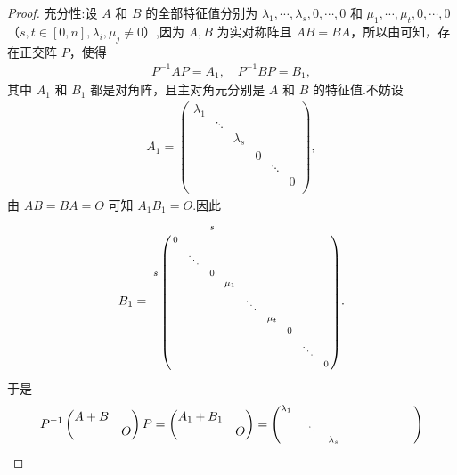 \documentclass[../../main.tex]{subfiles}
\begin{document}
\begin{proof}
{\heiti 充分性:}设 $A$ 和 $B$ 的全部特征值分别为 $\lambda _1,\cdots ,\lambda _s,0,\cdots ,0$ 和 $\mu _1,\cdots ,\mu _t,0,\cdots ,0$（$s,t\in [0,n],\lambda _i,\mu _j\ne 0$）,因为 $A,B$ 为实对称阵且 $AB=BA$，所以由可知，存在正交阵 $P$，使得
\begin{align*}
P^{-1}AP=A_1,\quad P^{-1}BP=B_1,
\end{align*}
其中 $A_1$ 和 $B_1$ 都是对角阵，且主对角元分别是 $A$ 和 $B$ 的特征值.不妨设
\begin{align*}
A_1=\begin{pmatrix}
\lambda _1&		&		&		&		&		\\
&		\ddots&		&		&		&		\\
&		&		\lambda _s&		&		&		\\
&		&		&		0&		&		\\
&		&		&		&		\ddots&		\\
&		&		&		&		&		0\\
\end{pmatrix},
\end{align*}
由 $AB=BA=O$ 可知 $A_1B_1=O$.因此
\begin{align*}
B_1=\begin{scriptsize}\bordermatrix{%
&       &		&		s&		&		&		&		&		&		\cr
&       0&		&		&		&		&		&		&		&		\cr
&       &		\ddots&		&		&		&		&		&		&		\cr
s&       &		&		0&		&		&		&		&		&		\cr
&       &		&		&		\mu _1&		&		&		&		&		\cr
&       &		&		&		&		\ddots&		&		&		&		\cr
&       &		&		&		&		&		\mu _t&		&		&		\cr
&       &		&		&		&		&		&		0&		&		\cr
&       &		&		&		&		&		&		&		\ddots&		\cr
&       &		&		&		&		&		&		&		&		0\cr
}\end{scriptsize}.
\end{align*}
于是
\begin{align*}
P^{-1}\begin{pmatrix}
A+B&		\\
&		O\\
\end{pmatrix} P=\begin{pmatrix}
A_1+B_1&		\\
&		O\\
\end{pmatrix} =\begin{scriptsize}\begin{pmatrix}
\lambda _1&		&		&		&		&		&		&		&		\\
&		\ddots&		&		&		&		&		&		&		\\
&		&		\lambda _s&		&		&		&		&		&		\\

\end{pmatrix}
\end{scriptsize}
\end{align*}
\end{proof}
\end{document}
